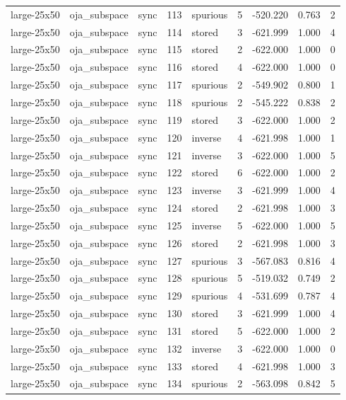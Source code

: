 \begin{tabular}{lllrlrrrr}
large-25x50 & oja\_subspace & sync & 113 & spurious & 5 & -520.220 & 0.763 & 2 \\
large-25x50 & oja\_subspace & sync & 114 & stored & 3 & -621.999 & 1.000 & 4 \\
large-25x50 & oja\_subspace & sync & 115 & stored & 2 & -622.000 & 1.000 & 0 \\
large-25x50 & oja\_subspace & sync & 116 & stored & 4 & -622.000 & 1.000 & 0 \\
large-25x50 & oja\_subspace & sync & 117 & spurious & 2 & -549.902 & 0.800 & 1 \\
large-25x50 & oja\_subspace & sync & 118 & spurious & 2 & -545.222 & 0.838 & 2 \\
large-25x50 & oja\_subspace & sync & 119 & stored & 3 & -622.000 & 1.000 & 2 \\
large-25x50 & oja\_subspace & sync & 120 & inverse & 4 & -621.998 & 1.000 & 1 \\
large-25x50 & oja\_subspace & sync & 121 & inverse & 3 & -622.000 & 1.000 & 5 \\
large-25x50 & oja\_subspace & sync & 122 & stored & 6 & -622.000 & 1.000 & 2 \\
large-25x50 & oja\_subspace & sync & 123 & inverse & 3 & -621.999 & 1.000 & 4 \\
large-25x50 & oja\_subspace & sync & 124 & stored & 2 & -621.998 & 1.000 & 3 \\
large-25x50 & oja\_subspace & sync & 125 & inverse & 5 & -622.000 & 1.000 & 5 \\
large-25x50 & oja\_subspace & sync & 126 & stored & 2 & -621.998 & 1.000 & 3 \\
large-25x50 & oja\_subspace & sync & 127 & spurious & 3 & -567.083 & 0.816 & 4 \\
large-25x50 & oja\_subspace & sync & 128 & spurious & 5 & -519.032 & 0.749 & 2 \\
large-25x50 & oja\_subspace & sync & 129 & spurious & 4 & -531.699 & 0.787 & 4 \\
large-25x50 & oja\_subspace & sync & 130 & stored & 3 & -621.999 & 1.000 & 4 \\
large-25x50 & oja\_subspace & sync & 131 & stored & 5 & -622.000 & 1.000 & 2 \\
large-25x50 & oja\_subspace & sync & 132 & inverse & 3 & -622.000 & 1.000 & 0 \\
large-25x50 & oja\_subspace & sync & 133 & stored & 4 & -621.998 & 1.000 & 3 \\
large-25x50 & oja\_subspace & sync & 134 & spurious & 2 & -563.098 & 0.842 & 5 \\

\end{tabular}
